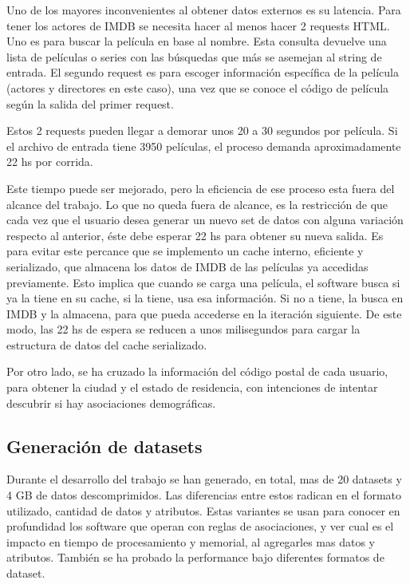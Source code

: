 \documentclass[journal]{IEEEtran}
\begin{document}
Uno de los mayores inconvenientes al obtener datos externos es su latencia. Para tener
los actores de IMDB se necesita hacer al menos hacer 2 requests HTML. Uno es para buscar la
película en base al nombre. Esta consulta devuelve una lista de películas o series con
las búsquedas que más se asemejan al string de entrada. El segundo request es para 
escoger información específica de la película (actores y directores en este caso), una vez
que se conoce el código de película según la salida del primer request.

Estos 2 requests pueden llegar a demorar unos 20 a 30 segundos por película. Si el archivo de
entrada tiene 3950 películas, el proceso demanda aproximadamente 22 hs por corrida.

Este tiempo puede ser mejorado, pero la eficiencia de ese proceso esta fuera del alcance del trabajo.
Lo que no queda fuera de alcance, es la restricción de que cada vez que el usuario desea
generar un nuevo set de datos con alguna variación respecto al anterior, éste debe esperar
22 hs para obtener su nueva salida. Es para evitar este percance que se implemento un cache interno, 
eficiente y serializado, que almacena los datos de IMDB de las películas ya accedidas previamente.
Esto implica que cuando se carga una película, el software busca si ya la tiene en su cache,
 si la tiene, usa esa información. Si no a tiene, la busca en IMDB y la almacena, para que 
pueda accederse en la iteración siguiente. De este modo, las 22 hs de espera se reducen a
unos milisegundos para cargar la estructura de datos del cache serializado.

Por otro lado, se ha cruzado la información del código postal de cada usuario, para
obtener la ciudad y el estado de residencia, con intenciones de intentar descubrir
si hay asociaciones demográficas.

\subsection{Generación de datasets}
Durante el desarrollo del trabajo se han generado, en total, mas de 20 datasets y 4 GB de datos descomprimidos. 
Las diferencias entre estos radican en el formato utilizado, cantidad de datos y atributos. Estas variantes se
usan para conocer en profundidad los software que operan con reglas de asociaciones, y
ver cual es el impacto en tiempo de procesamiento y memorial, al agregarles mas
datos y atributos.
También se ha probado la performance bajo diferentes formatos de dataset.
\end{document}
